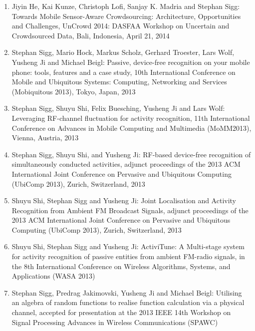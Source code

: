 \documentclass[12pt]{article}
\newcounter{saveenumi}
\begin{document}
\begin{enumerate}
\setcounter{enumi}{\value{saveenumi}}
\item Jiyin He, Kai Kunze, Christoph Lofi, Sanjay K. Madria and Stephan Sigg: Towards Mobile Sensor-Aware Crowdsourcing: Architecture, Opportunities and Challenges, UnCrowd 2014: DASFAA Workshop on Uncertain and Crowdsourced Data, Bali, Indonesia, April 21, 2014
\item Stephan Sigg, Mario Hock, Markus Scholz, Gerhard Troester, Lars Wolf, Yusheng Ji and Michael Beigl: Passive, device-free recognition on your mobile phone: tools, features and a case study, 10th International Conference on Mobile and Ubiquitous Systems: Computing, Networking and Services (Mobiquitous 2013), Tokyo, Japan, 2013
\item Stephan Sigg, Shuyu Shi, Felix Buesching, Yusheng Ji and Lars Wolf: Leveraging RF-channel fluctuation for activity recognition, 11th International Conference on Advances in Mobile Computing and Multimedia (MoMM2013), Vienna, Austria, 2013
\item Stephan Sigg, Shuyu Shi, and Yusheng Ji: RF-based device-free recognition of simultaneously conducted activities, adjunct proceedings of the 2013 ACM International Joint Conference on Pervasive and Ubiquitous Computing (UbiComp 2013), Zurich, Switzerland, 2013
\item Shuyu Shi, Stephan Sigg and Yusheng Ji: Joint Localisation and Activity Recognition from Ambient FM Broadcast Signals, adjunct proceedings of the 2013 ACM International Joint Conference on Pervasive and Ubiquitous Computing (UbiComp 2013), Zurich, Switzerland, 2013
\item Shuyu Shi, Stephan Sigg and Yusheng Ji: ActiviTune: A Multi-stage system for activity recognition of passive entities from ambient FM-radio signals, in the 8th International Conference on Wireless Algorithms, Systems, and Applications (WASA 2013)
\item Stephan Sigg, Predrag Jakimovski, Yusheng Ji and Michael Beigl: Utilising an algebra of random functions to realise function calculation via a physical channel, accepted for presentation at the 2013 IEEE 14th Workshop on Signal Processing Advances in Wireless Communications (SPAWC)

\end{enumerate}
\end{document}
